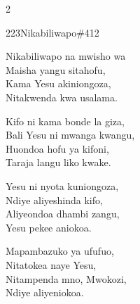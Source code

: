 \documentclass{article}
\begin{document}
\begin{multicols}{2}
\begin{hymn}{223}{Nikabiliwapo}{\#412}
\begin{stanza}
Nikabiliwapo na mwisho wa\\
Maisha yangu sitahofu,\\
Kama Yesu akiniongoza,\\
Nitakwenda kwa usalama.
\end{stanza}
\begin{stanza}
Kifo ni kama bonde la giza,\\
Bali Yesu ni mwanga kwangu,\\
Huondoa hofu ya kifoni,\\
Taraja langu liko kwake.
\end{stanza}
\begin{stanza}
Yesu ni nyota kuniongoza,\\
Ndiye aliyeshinda kifo,\\
Aliyeondoa dhambi zangu,\\
Yesu pekee aniokoa.
\end{stanza}
\begin{stanza}
Mapambazuko ya ufufuo,\\
Nitatokea naye Yesu,\\
Nitampenda mno, Mwokozi,\\
Ndiye aliyeniokoa.
\end{stanza}
\end{hymn}


\end{multicols}
\end{document}
